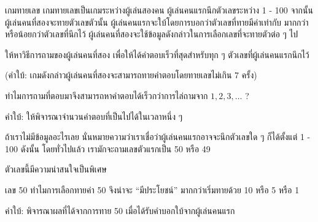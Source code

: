 \begin{quiz}{เกม{\wbr}ทาย{\wbr}เลข}
เกม{\wbr}ทาย{\wbr}เลข{\wbr}เป็น{\wbr}เกม{\wbr}ระหว่าง{\wbr}ผู้{\wbr}เล่น{\wbr}สอง{\wbr}คน ผู้{\wbr}เล่น{\wbr}คน{\wbr}แรก{\wbr}นึก{\wbr}ตัวเลข{\wbr}ระหว่าง 1 - 100
จากนั้น{\wbr}ผู้{\wbr}เล่น{\wbr}คน{\wbr}ที่{\wbr}สอง{\wbr}จะ{\wbr}ทาย{\wbr}ตัวเลข{\wbr}ตัว{\wbr}นั้น{\wbr}
ผู้{\wbr}เล่น{\wbr}คน{\wbr}แรก{\wbr}จะ{\wbr}ใบ้{\wbr}โดย{\wbr}การ{\wbr}บอก{\wbr}ว่า{\wbr}ตัวเลข{\wbr}ที่{\wbr}ทาย{\wbr}มี{\wbr}ค่า{\wbr}เท่า{\wbr}กับ มาก{\wbr}กว่า หรือ{\wbr}น้อย{\wbr}กว่า{\wbr}ตัวเลข{\wbr}ที่{\wbr}นึก{\wbr}ไว้{\wbr}
ผู้{\wbr}เล่น{\wbr}คน{\wbr}ที่{\wbr}สอง{\wbr}จะ{\wbr}ใช้{\wbr}ข้อมูล{\wbr}ดังกล่าว{\wbr}ใน{\wbr}การ{\wbr}เลือก{\wbr}เลขที่{\wbr}จะ{\wbr}ทาย{\wbr}ตัว{\wbr}ต่อ ๆ ไป{\wbr}

ให้{\wbr}หา{\wbr}วิธีการ{\wbr}ถาม{\wbr}ของ{\wbr}ผู้{\wbr}เล่น{\wbr}คน{\wbr}ที่{\wbr}สอง เพื่อให้{\wbr}ได้{\wbr}คำตอบ{\wbr}เร็ว{\wbr}ที่สุด{\wbr}สำหรับ{\wbr}ทุก ๆ
ตัวเลข{\wbr}ที่{\wbr}ผู้{\wbr}เล่น{\wbr}คน{\wbr}แรก{\wbr}นึก{\wbr}ไว้{\wbr}

(คำ{\wbr}ใบ้: เกม{\wbr}ดังกล่าว{\wbr}ผู้{\wbr}เล่น{\wbr}คน{\wbr}ที่{\wbr}สอง{\wbr}จะ{\wbr}สามารถ{\wbr}ทาย{\wbr}คำตอบ{\wbr}โดย{\wbr}ทาย{\wbr}เลข{\wbr}ไม่{\wbr}เกิน 7 ครั้ง)
\end{quiz}

\begin{quiz}{}
ทำไม{\wbr}การ{\wbr}ถาม{\wbr}ที่{\wbr}ตอบ{\wbr}มา{\wbr}จึง{\wbr}สามารถ{\wbr}หา{\wbr}คำตอบ{\wbr}ได้{\wbr}เร็ว{\wbr}กว่า{\wbr}การ{\wbr}ไล่{\wbr}ถาม{\wbr}จาก $1,2,3,\ldots$ ? 

คำ{\wbr}ใบ้: ให้{\wbr}พิจารณา{\wbr}จำนวน{\wbr}คำตอบ{\wbr}ที่{\wbr}เป็น{\wbr}ไป{\wbr}ได้{\wbr}ใน{\wbr}เวลา{\wbr}หนึ่ง ๆ
\end{quiz}

ถ้า{\wbr}เรา{\wbr}ไม่{\wbr}มี{\wbr}ข้อมูล{\wbr}อะไร{\wbr}เลย นั่น{\wbr}หมายความ{\wbr}ว่า{\wbr}เรา{\wbr}เชื่อ{\wbr}ว่า{\wbr}ผู้{\wbr}เล่น{\wbr}คน{\wbr}แรก{\wbr}อาจ{\wbr}จะ{\wbr}นึก{\wbr}ตัวเลข{\wbr}ใด ๆ
ก็ได้{\wbr}ตั้งแต่ 1 - 100 ดังนั้น โดย{\wbr}ทั่วไป{\wbr}แล้ว เรา{\wbr}มักจะ{\wbr}ถาม{\wbr}เลข{\wbr}ตัว{\wbr}แรก{\wbr}เป็น 50 หรือ 49

ตัวเลข{\wbr}นี้{\wbr}มี{\wbr}ความ{\wbr}น่า{\wbr}สนใจ{\wbr}เป็นพิเศษ{\wbr}

\begin{quiz}{เลข 50}
ทำไม{\wbr}การ{\wbr}เลือก{\wbr}ทาย{\wbr}ค่า 50 จึง{\wbr}น่าจะ ``มี{\wbr}ประโยชน์'' มาก{\wbr}กว่า{\wbr}เริ่ม{\wbr}ทาย{\wbr}ด้วย 10 หรือ 5 หรือ 1

คำ{\wbr}ใบ้: พิจารณา{\wbr}ผล{\wbr}ที่{\wbr}ได้{\wbr}จาก{\wbr}การ{\wbr}ทาย 50 เมื่อ{\wbr}ได้{\wbr}รับคำ{\wbr}บอกใบ้{\wbr}จาก{\wbr}ผู้{\wbr}เล่น{\wbr}คน{\wbr}แรก{\wbr}
\end{quiz}

